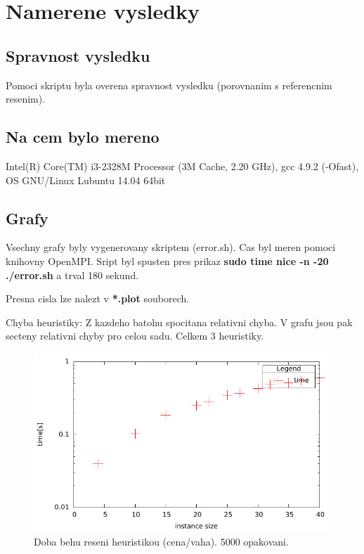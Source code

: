 \documentclass[12pt,a4paper]{article}
\begin{document}
\section{Namerene vysledky}

\subsection{Spravnost vysledku}
Pomoci skriptu byla overena spravnost vysledku (porovnanim s referencnim resenim).

\subsection{Na cem bylo mereno}
Intel(R) Core(TM) i3-2328M Processor (3M Cache, 2.20 GHz), gcc 4.9.2 (-Ofast), OS GNU/Linux Lubuntu 14.04 64bit

\subsection{Grafy}
Vsechny grafy byly vygenerovany skriptem (error.sh). Cas byl meren pomoci knihovny OpenMPI.
Sript byl spusten pres prikaz \textbf{sudo time nice -n -20 ./error.sh} a trval 180 sekund.

Presna cisla lze nalezt v \textbf{*.plot} souborech.

Chyba heuristiky: Z kazdeho batohu spocitana relativni chyba. V grafu jsou pak secteny relativni chyby pro celou sadu. Celkem 3 heuristiky.

\begin{figure}[H]
	\caption{Doba behu reseni heuristikou (cena/vaha). 5000 opakovani. }
	\includegraphics{./time_h1.pdf}
\end{figure}
\end{document}
